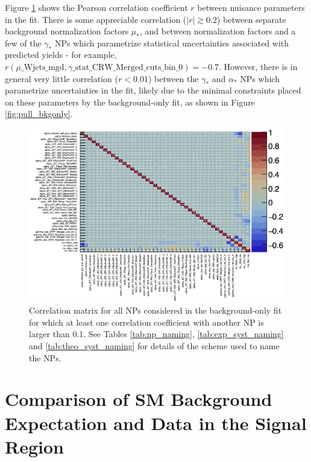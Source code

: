 Figure \ref{fig:corrs_bkgonly} shows the Pearson correlation coefficient \(r\) between nuisance parameters in the fit. There is some appreciable correlation (\(|r|\gtrsim0.2\)) between separate background normalization factors \(\mu_*\), and between normalization factors and a few of the \(\gamma_*\) NPs which parametrize statistical uncertainties associated with predicted yields - for example, \(r(\mu\_\text{Wjets\_mgd}, \gamma\_\text{stat\_CRW\_Merged\_cuts\_bin\_0})=-0.7\). However, there is in general very little correlation (\(r<0.01\)) between the \(\gamma_*\) and \(\alpha_*\) NPs which parametrize uncertainties in the fit, likely due to the minimal constraints placed on these parameters by the background-only fit, as shown in Figure \ref{fig:pull_bkgonly}.

\begin{figure}[h]
  \centering
  \includegraphics[width=\textwidth]{Figures/8/BkgOnly/c_corrMatrix_RooExpandedFitResult_afterFit_edited.pdf}
  \caption[Pull plots for background-only fit]{\footnotesize{Correlation matrix for all NPs considered in the background-only fit for which at least one correlation coefficient with another NP is larger than 0.1. See Tables \ref{tab:np_naming}, \ref{tab:exp_syst_naming} and \ref{tab:theo_syst_naming} for details of the scheme used to name the NPs.}}
  \label{fig:corrs_bkgonly}
\end{figure}

\section{Comparison of SM Background Expectation and Data in the Signal Region}


